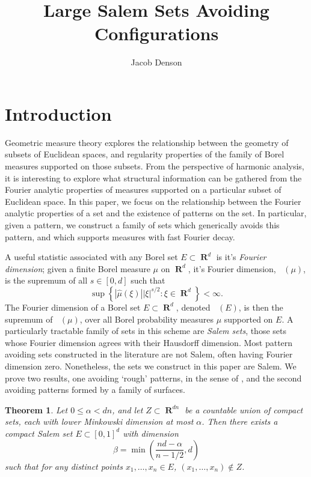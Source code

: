 \documentclass[12pt,reqno]{article}
\title{Large Salem Sets Avoiding Configurations}
\author{Jacob Denson}
\numberwithin{equation}{section}
\DeclareMathOperator{\fordim}{\dim_{\mathbf{F}}}
\DeclareMathOperator{\RR}{\mathbf{R}}
\newtheorem{theorem}{Theorem}
\numberwithin{theorem}{section}
\begin{document}
\maketitle

\section{Introduction}

Geometric measure theory explores the relationship between the geometry of subsets of Euclidean spaces, and regularity properties of the family of Borel measures supported on those subsets. From the perspective of harmonic analysis, it is interesting to explore what structural information can be gathered from the Fourier analytic properties of measures supported on a particular subset of Euclidean space. In this paper, we focus on the relationship between the Fourier analytic properties of a set and the existence of patterns on the set. In particular, given a pattern, we construct a family of sets which generically avoids this pattern, and which supports measures with fast Fourier decay.

A useful statistic associated with any Borel set $E \subset \RR^d$ is it's \emph{Fourier dimension}; given a finite Borel measure $\mu$ on $\RR^d$, it's Fourier dimension, $\fordim(\mu)$, is the supremum of all $s \in [0,d]$ such that
%
\begin{equation} \label{fordim}
    \sup \left\{ |\widehat{\mu}(\xi)| |\xi|^{s/2} : \xi \in \RR^d \right\} < \infty.
\end{equation}
%
The Fourier dimension of a Borel set $E \subset \RR^d$, denoted $\fordim(E)$, is then the supremum of $\fordim(\mu)$, over all Borel probability measures $\mu$ supported on $E$. A particularly tractable family of sets in this scheme are \emph{Salem sets}, those sets whose Fourier dimension agrees with their Hausdorff dimension. Most pattern avoiding sets constructed in the literature are not Salem, often having Fourier dimension zero. Nonetheless, the sets we construct in this paper are Salem. We prove two results, one avoiding `rough' patterns, in the sense of \cite{OurPaper}, and the second avoiding patterns formed by a family of surfaces.

\begin{theorem} \label{maintheorem}
    Let $0 \leq \alpha < dn$, and let $Z \subset \RR^{dn}$ be a countable union of compact sets, each with lower Minkowski dimension at most $\alpha$. Then there exists a compact Salem set $E \subset [0,1]^d$ with dimension
    \[ \beta = \min \left( \frac{nd - \alpha}{n-1/2}, d \right) \]
    such that for any distinct points $x_1, \dots, x_n \in E$, $(x_1, \dots, x_n) \not \in Z$.
\end{theorem}
\end{document}
